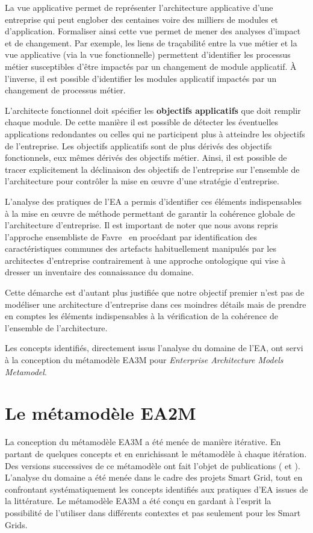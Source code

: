     La vue applicative permet de représenter l'architecture applicative d'une entreprise qui peut englober
    des centaines voire des milliers de modules et d'application. Formaliser ainsi cette vue permet de mener
    des analyses d'impact et de changement. Par exemple, les liens de traçabilité entre la vue métier et la
    vue applicative (via la vue fonctionnelle) permettent d'identifier les processus métier susceptibles d'être
    impactés par un changement de module applicatif. À l'inverse, il est possible d'identifier les modules
    applicatif impactés par un changement de processus métier.

    L'architecte fonctionnel doit spécifier les \textbf{objectifs applicatifs} que doit remplir chaque module. De
    cette manière il est possible de détecter les éventuelles applications redondantes ou celles qui
    ne participent plus à atteindre les objectifs de l'entreprise. Les objectifs applicatifs sont de plus dérivés
    des objectifs fonctionnels, eux mêmes dérivés des objectifs métier. Ainsi, il est possible de tracer
    explicitement la déclinaison des objectifs de l'entreprise sur l'ensemble de l'architecture pour contrôler
    la mise en œuvre d'une stratégie d'entreprise.

    L'analyse des pratiques de l'EA a permis d'identifier ces éléments indispensables à la mise en œuvre
    de méthode permettant de garantir la cohérence globale de l'architecture d'entreprise. Il est important
    de noter que nous avons repris l'approche ensembliste de Favre~\cite{favre2005foundations} en procédant
    par identification des caractéristiques communes des artefacts habituellement manipulés par
    les architectes d'entreprise contrairement à une approche ontologique qui vise à dresser un inventaire des
    connaissance du domaine.

    Cette démarche est d'autant plus justifiée que notre objectif premier n'est pas de modéliser une architecture
    d'entreprise dans ces moindres détails mais de prendre en comptes les éléments indispensables à
    la vérification de la cohérence de l'ensemble de l'architecture.

    Les concepts identifiés, directement issus l'analyse du domaine de l'EA, ont servi à la conception du
    métamodèle EA3M pour \emph{Enterprise Architecture Models Metamodel}.

\section{Le métamodèle EA2M}
    La conception du métamodèle EA3M a été menée de manière itérative. En partant de quelques concepts
    et en enrichissant le métamodèle à chaque itération. Des versions successives de ce métamodèle
    ont fait l'objet de publications (\cite{seghiri2015simulation} et \cite{seghiri2016executable}).
    L'analyse du domaine a été menée dans le cadre des projets Smart Grid, tout en confrontant systématiquement
    les concepts identifiés aux pratiques d'EA issues de la littérature. Le métamodèle EA3M a été conçu en gardant
    à l'esprit la possibilité de l'utiliser dans différents contextes et pas seulement pour les Smart Grids.

